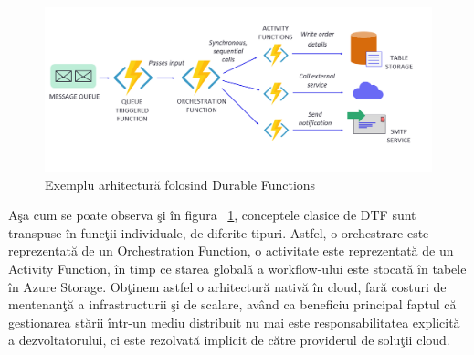  \begin{figure}[h]
\begin{center}
        \includegraphics[width=1\textwidth]{images/durable-functions}
			 \caption{Exemplu arhitectură folosind Durable Functions}
			 \label{fig:durable-functions}
\end{center}
\end{figure}
\par Aşa cum se poate observa şi în figura ~\ref{fig:durable-functions}, conceptele clasice de DTF sunt transpuse în funcţii individuale, de diferite tipuri. Astfel, o orchestrare este reprezentată de un Orchestration Function, o activitate este reprezentată de un Activity Function, în timp ce starea globală a workflow-ului este stocată în tabele în Azure Storage. Obţinem astfel o arhitectură nativă în cloud, fară costuri de mentenanţă a infrastructurii şi de scalare, având ca beneficiu principal faptul că gestionarea stării într-un mediu distribuit nu mai este responsabilitatea explicită a dezvoltatorului, ci este rezolvată implicit de către providerul de soluţii cloud. 
